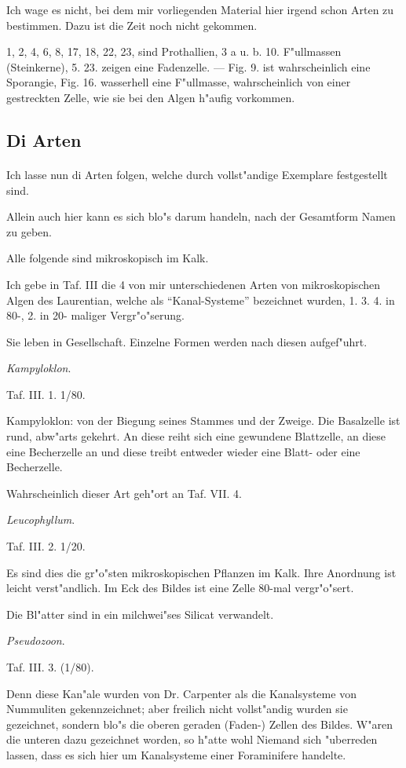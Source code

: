 \documentclass[a4paper, 11pt, oneside, german]{article}
\begin{document}
Ich wage es nicht, bei dem mir vorliegenden Material hier irgend schon Arten zu bestimmen. Dazu ist die Zeit noch nicht gekommen.

1, 2, 4, 6, 8, 17, 18, 22, 23, sind Prothallien, 3 a u. b. 10. F"ullmassen (Steinkerne), 5. 23. zeigen eine Fadenzelle. --- Fig. 9. ist wahrscheinlich eine Sporangie, Fig. 16. wasserhell eine F"ullmasse, wahrscheinlich von einer gestreckten Zelle, wie sie bei den Algen h"aufig vorkommen.
\clearpage
\subsection{Di Arten}
\paragraph{}
Ich lasse nun di Arten folgen, welche durch vollst"andige Exemplare festgestellt sind.

Allein auch hier kann es sich blo"s darum handeln, nach der Gesamtform Namen zu geben.

Alle folgende sind mikroskopisch im Kalk.

Ich gebe in Taf. III die 4 von mir unterschiedenen Arten von mikroskopischen Algen des Laurentian, welche als "`Kanal-Systeme"' bezeichnet wurden, 1. 3. 4. in 80-, 2. in 20- maliger Vergr"o"serung.

Sie leben in Gesellschaft. Einzelne Formen werden nach diesen aufgef"uhrt.

\centerline{\emph{Kampyloklon}.}

Taf. III. 1. 1/80.

Kampyloklon: von der Biegung seines Stammes und der Zweige. Die Basalzelle ist rund, abw"arts gekehrt. An diese reiht sich eine gewundene Blattzelle, an diese eine Becherzelle an und diese treibt entweder wieder eine Blatt- oder eine Becherzelle.

Wahrscheinlich dieser Art geh"ort an Taf. VII. 4.

\centerline{\emph{Leucophyllum}.}

Taf. III. 2. 1/20.

Es sind dies die gr"o"sten mikroskopischen Pflanzen im Kalk. Ihre Anordnung ist leicht verst"andlich. Im Eck des Bildes ist eine Zelle 80-mal vergr"o"sert.

Die Bl"atter sind in ein milchwei"ses Silicat verwandelt.

\centerline{\emph{Pseudozoon}.}

Taf. III. 3. (1/80).

Denn diese Kan"ale wurden von Dr. Carpenter als die Kanalsysteme von Nummuliten gekennzeichnet; aber freilich nicht vollst"andig wurden sie gezeichnet, sondern blo"s die oberen geraden (Faden-) Zellen des Bildes. W"aren die unteren dazu gezeichnet worden, so h"atte wohl Niemand sich "uberreden lassen, dass es sich hier um Kanalsysteme einer Foraminifere handelte.
\end{document}
